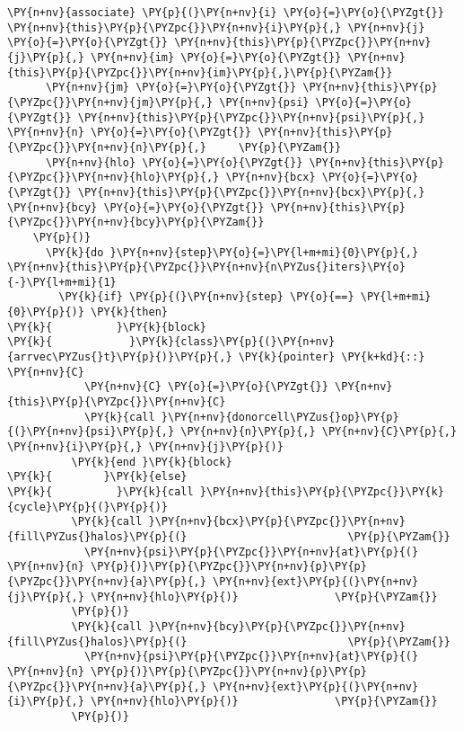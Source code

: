 \begin{Verbatim}[commandchars=\\\{\}]
    \PY{n+nv}{associate} \PY{p}{(}\PY{n+nv}{i} \PY{o}{=}\PY{o}{\PYZgt{}} \PY{n+nv}{this}\PY{p}{\PYZpc{}}\PY{n+nv}{i}\PY{p}{,} \PY{n+nv}{j} \PY{o}{=}\PY{o}{\PYZgt{}} \PY{n+nv}{this}\PY{p}{\PYZpc{}}\PY{n+nv}{j}\PY{p}{,} \PY{n+nv}{im} \PY{o}{=}\PY{o}{\PYZgt{}} \PY{n+nv}{this}\PY{p}{\PYZpc{}}\PY{n+nv}{im}\PY{p}{,}\PY{p}{\PYZam{}}
      \PY{n+nv}{jm} \PY{o}{=}\PY{o}{\PYZgt{}} \PY{n+nv}{this}\PY{p}{\PYZpc{}}\PY{n+nv}{jm}\PY{p}{,} \PY{n+nv}{psi} \PY{o}{=}\PY{o}{\PYZgt{}} \PY{n+nv}{this}\PY{p}{\PYZpc{}}\PY{n+nv}{psi}\PY{p}{,} \PY{n+nv}{n} \PY{o}{=}\PY{o}{\PYZgt{}} \PY{n+nv}{this}\PY{p}{\PYZpc{}}\PY{n+nv}{n}\PY{p}{,}     \PY{p}{\PYZam{}}
      \PY{n+nv}{hlo} \PY{o}{=}\PY{o}{\PYZgt{}} \PY{n+nv}{this}\PY{p}{\PYZpc{}}\PY{n+nv}{hlo}\PY{p}{,} \PY{n+nv}{bcx} \PY{o}{=}\PY{o}{\PYZgt{}} \PY{n+nv}{this}\PY{p}{\PYZpc{}}\PY{n+nv}{bcx}\PY{p}{,} \PY{n+nv}{bcy} \PY{o}{=}\PY{o}{\PYZgt{}} \PY{n+nv}{this}\PY{p}{\PYZpc{}}\PY{n+nv}{bcy}\PY{p}{\PYZam{}}
    \PY{p}{)}
      \PY{k}{do }\PY{n+nv}{step}\PY{o}{=}\PY{l+m+mi}{0}\PY{p}{,} \PY{n+nv}{this}\PY{p}{\PYZpc{}}\PY{n+nv}{n\PYZus{}iters}\PY{o}{-}\PY{l+m+mi}{1}
        \PY{k}{if} \PY{p}{(}\PY{n+nv}{step} \PY{o}{==} \PY{l+m+mi}{0}\PY{p}{)} \PY{k}{then}
\PY{k}{          }\PY{k}{block}
\PY{k}{            }\PY{k}{class}\PY{p}{(}\PY{n+nv}{arrvec\PYZus{}t}\PY{p}{)}\PY{p}{,} \PY{k}{pointer} \PY{k+kd}{::} \PY{n+nv}{C}
            \PY{n+nv}{C} \PY{o}{=}\PY{o}{\PYZgt{}} \PY{n+nv}{this}\PY{p}{\PYZpc{}}\PY{n+nv}{C}
            \PY{k}{call }\PY{n+nv}{donorcell\PYZus{}op}\PY{p}{(}\PY{n+nv}{psi}\PY{p}{,} \PY{n+nv}{n}\PY{p}{,} \PY{n+nv}{C}\PY{p}{,} \PY{n+nv}{i}\PY{p}{,} \PY{n+nv}{j}\PY{p}{)}
          \PY{k}{end }\PY{k}{block}
\PY{k}{        }\PY{k}{else}
\PY{k}{          }\PY{k}{call }\PY{n+nv}{this}\PY{p}{\PYZpc{}}\PY{k}{cycle}\PY{p}{(}\PY{p}{)}
          \PY{k}{call }\PY{n+nv}{bcx}\PY{p}{\PYZpc{}}\PY{n+nv}{fill\PYZus{}halos}\PY{p}{(}                         \PY{p}{\PYZam{}}
            \PY{n+nv}{psi}\PY{p}{\PYZpc{}}\PY{n+nv}{at}\PY{p}{(} \PY{n+nv}{n} \PY{p}{)}\PY{p}{\PYZpc{}}\PY{n+nv}{p}\PY{p}{\PYZpc{}}\PY{n+nv}{a}\PY{p}{,} \PY{n+nv}{ext}\PY{p}{(}\PY{n+nv}{j}\PY{p}{,} \PY{n+nv}{hlo}\PY{p}{)}               \PY{p}{\PYZam{}}
          \PY{p}{)}
          \PY{k}{call }\PY{n+nv}{bcy}\PY{p}{\PYZpc{}}\PY{n+nv}{fill\PYZus{}halos}\PY{p}{(}                         \PY{p}{\PYZam{}}
            \PY{n+nv}{psi}\PY{p}{\PYZpc{}}\PY{n+nv}{at}\PY{p}{(} \PY{n+nv}{n} \PY{p}{)}\PY{p}{\PYZpc{}}\PY{n+nv}{p}\PY{p}{\PYZpc{}}\PY{n+nv}{a}\PY{p}{,} \PY{n+nv}{ext}\PY{p}{(}\PY{n+nv}{i}\PY{p}{,} \PY{n+nv}{hlo}\PY{p}{)}               \PY{p}{\PYZam{}}
          \PY{p}{)}


\end{Verbatim}
